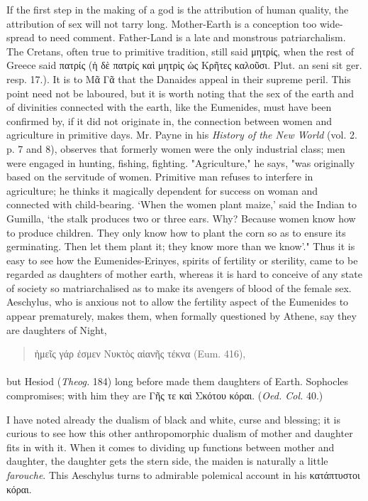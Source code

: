 \documentclass[a4paper, 11pt, oneside, polutonikogreek, english]{article}
\begin{document}
If the first step in the making of a god is the attribution of human quality, the attribution of sex will not tarry long. Mother-Earth is a conception too wide-spread to need comment. Father-Land is a late and monstrous patriarchalism. The Cretans, often true to primitive tradition, still said μητρίς, when the rest of Greece said πατρίς (ἡ δὲ πατρίς καὶ μητρὶς ὡς Κρῆτες καλοῦσι. Plut. an seni sit ger. resp. 17.). It is to Μᾶ Γᾶ that the Danaides appeal in their supreme peril. This point need not be laboured, but it is worth noting that the sex of the earth and of divinities connected with the earth, like the Eumenides, must have been confirmed by, if it did not originate in, the connection between women and agriculture in primitive days. Mr. Payne in his \emph{History of the New World} (vol. 2. p. 7 and 8), observes that formerly women were the only industrial class; men were engaged in hunting, fishing, fighting. "Agriculture," he says, "was originally based on the servitude of women. Primitive man refuses to interfere in agriculture; he thinks it magically dependent for success on woman and connected with child-bearing. `When the women plant maize,' said the Indian to Gumilla, `the stalk produces two or three ears. Why? Because women know how to produce children. They only know how to plant the corn so as to ensure its germinating. Then let them plant it; they know more than we know'." Thus it is easy to see how the Eumenides-Erinyes, spirits of fertility or sterility, came to be regarded as daughters of mother earth, whereas it is hard to conceive of any state of society so matriarchalised as to make its avengers of blood of the female sex. Aeschylus, who is anxious not to allow the fertility aspect of the Eumenides to appear prematurely, makes them, when formally questioned by Athene, say they are daughters of Night,
\begin{quotation}
ἡμεῖς γάρ ἐσμεν Νυκτὸς αἰανῆς τέκνα (Eum. 416),
\end{quotation}
\paragraph{}
but Hesiod (\emph{Theog.} 184) long before made them daughters of Earth. Sophocles compromises; with him they are Γῆς τε καὶ Σκότου κόραι. (\emph{Oed. Col.} 40.)

I have noted already the dualism of black and white, curse and blessing; it is curious to see how this other anthropomorphic dualism of mother and daughter fits in with it. When it comes to dividing up functions between mother and daughter, the daughter gets the stern side, the maiden is naturally a little \emph{farouche}. This Aeschylus turns to admirable polemical account in his κατάπτυστοι κόραι.
\end{document}
